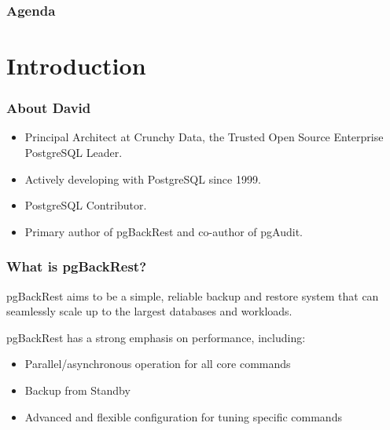 %
\def\mytitle{pgBackRest Overview}
\def\mysubject{}
\def\myevent{Crunchy Storm}
\def\myauthor{David Steele}
\def\myemail{}
\def\mydate{November 28, 2018}

\def\mysuppressnav{}

\def\mytemplatepath{/template/}


\begin{frame}
    \frametitle{Agenda}
    \tableofcontents
\end{frame}

\section{Introduction}

\begin{frame}
    \frametitle{About David}

    \begin{itemize}
        \item Principal Architect at Crunchy Data, the Trusted Open Source Enterprise PostgreSQL Leader.
        \item Actively developing with PostgreSQL since 1999.
        \item PostgreSQL Contributor.
        \item Primary author of pgBackRest and co-author of pgAudit.
    \end{itemize}
\end{frame}

\begin{frame}
    \frametitle{What is pgBackRest?}

    pgBackRest aims to be a simple, reliable backup and restore system that can seamlessly scale up to the largest databases and workloads.\pause\vspace{1em}

    pgBackRest has a strong emphasis on performance, including:

    \begin{itemize}
        \item Parallel/asynchronous operation for all core commands\pause
        \item Backup from Standby\pause
        \item Advanced and flexible configuration for tuning specific commands
    \end{itemize}
\end{frame}


